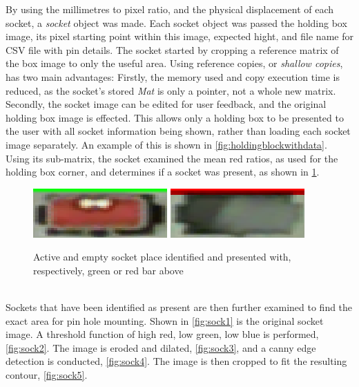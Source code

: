 \documentclass[11pt,a4paper, margin=1in]{report}
\begin{document}
By using the millimetres to pixel ratio, and the physical displacement of each socket, a \textit{socket} object was made. Each socket object was passed the holding box image, its pixel starting point within this image, expected hight, and file name for CSV file with pin details. The socket started by cropping a reference matrix of the box image to only the useful area. Using reference copies, or \textit{shallow copies}, has two main advantages: Firstly, the memory used  and copy execution time is reduced, as the socket's stored \textit{Mat} is only a pointer, not a whole new matrix. Secondly, the socket image can be edited for user feedback, and the original holding box image is effected. This allows only a holding box to be presented to the user with all socket information being shown, rather than loading each socket image separately. An example of this is shown in \cref{fig:holdingblockwithdata}. \\
Using its sub-matrix, the socket examined the mean red ratios, as used for the holding box corner, and determines if a socket was present, as shown in \cref{fig:fullSock}.
\begin{figure}[h]
\centering
\includegraphics[width=0.4\linewidth]{fullSock} %
\includegraphics[width=0.4\linewidth]{emptySock}
\caption{Active and empty socket place identified and presented with, respectively, green or red bar above}
\label{fig:fullSock}
\end{figure}\\

Sockets that have been identified as present are then further examined to find the exact area for pin hole mounting. Shown in \cref{fig:sock1} is the original socket image. A threshold function of high red, low green, low blue is performed, \cref{fig:sock2}. The image is eroded and dilated, \cref{fig:sock3}, and a canny edge detection is conducted, \cref{fig:sock4}. The image is then cropped to fit the resulting contour, \cref{fig:sock5}.\\
\end{document}
